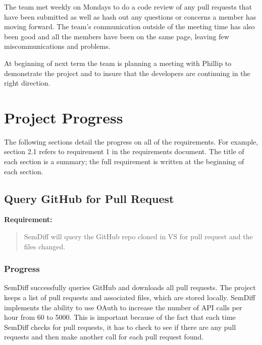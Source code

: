 \documentclass[draftclsnofoot,onecolumn]{IEEEtran}
\begin{document}
The team met weekly on Mondays to do a code review of any pull requests that 
have been submitted as well as hash out any questions or concerns a member 
has moving forward. The team’s communication outside of the meeting time has 
also been good and all the members have been on the same page, leaving few 
miscommunications and problems.

At beginning of next term the team is planning a meeting with Phillip to 
demonstrate the project and to insure that the developers are continuing in 
the right direction.











\section{Project Progress}
The following sections detail the progress on all of the requirements. For 
example, section 2.1 refers to requirement 1 in the requirements document. 
The title of each section is a summary; the full requirement is written at 
the beginning of each section.






\subsection{Query GitHub for Pull Request}

\textbf{Requirement:}

\begin{quote}

SemDiff will query the GitHub repo cloned in VS for pull request and the 
files changed.

\end{quote}

\subsubsection{Progress}

SemDiff successfully queries GitHub and downloads all pull requests. The 
project keeps a list of pull requests and associated files, which are stored 
locally. SemDiff implements the ability to use OAuth to increase the number 
of API calls per hour from 60 to 5000. This is important because of the fact 
that each time SemDiff checks for pull requests, it has to check to see if 
there are any pull requests and then make another call for each pull request 
found.
\end{document}
